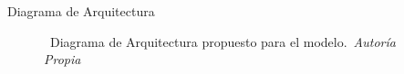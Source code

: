 \begin{frame}{Diagrama de Arquitectura}%
    \vspace{-0.15cm}
    \begin{figure}[H]
        \centering
        \href{run:C:/Users/emicr/Documents/ESCOLARES/ESCOM/TRABAJO TERMINAL/Presentacion/img/Design/Arquitectura.drawio}{%
        }
        \vspace{-0.25cm}
        \caption{\tiny~Diagrama de Arquitectura propuesto para el modelo.~\textit{Autoría Propia}}%
        \label{fig:architecture_diagram}
    \end{figure}
\end{frame}

